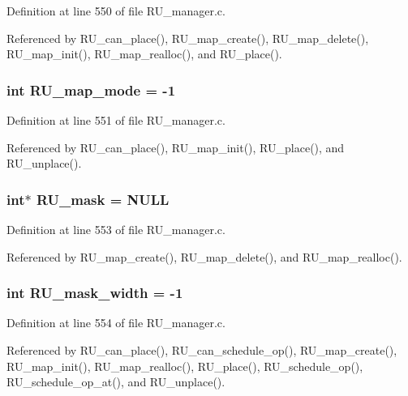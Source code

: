 Definition at line 550 of file RU\_\-manager.c.

Referenced by RU\_\-can\_\-place(), RU\_\-map\_\-create(), RU\_\-map\_\-delete(), RU\_\-map\_\-init(), RU\_\-map\_\-realloc(), and RU\_\-place().
\subsubsection{\setlength{\rightskip}{0pt plus 5cm}int \bf{RU\_\-map\_\-mode} = -1}\label{RU__manager_8c_ab284499f85b8370428d80e89545a59a}




Definition at line 551 of file RU\_\-manager.c.

Referenced by RU\_\-can\_\-place(), RU\_\-map\_\-init(), RU\_\-place(), and RU\_\-unplace().
\subsubsection{\setlength{\rightskip}{0pt plus 5cm}int$\ast$ \bf{RU\_\-mask} = \bf{NULL}}\label{RU__manager_8c_82ca50c94ed1893421f461fb9d7cd40e}




Definition at line 553 of file RU\_\-manager.c.

Referenced by RU\_\-map\_\-create(), RU\_\-map\_\-delete(), and RU\_\-map\_\-realloc().
\subsubsection{\setlength{\rightskip}{0pt plus 5cm}int \bf{RU\_\-mask\_\-width} = -1}\label{RU__manager_8c_056f20a9e7273cb15678a35197ead400}




Definition at line 554 of file RU\_\-manager.c.

Referenced by RU\_\-can\_\-place(), RU\_\-can\_\-schedule\_\-op(), RU\_\-map\_\-create(), RU\_\-map\_\-init(), RU\_\-map\_\-realloc(), RU\_\-place(), RU\_\-schedule\_\-op(), RU\_\-schedule\_\-op\_\-at(), and RU\_\-unplace().
